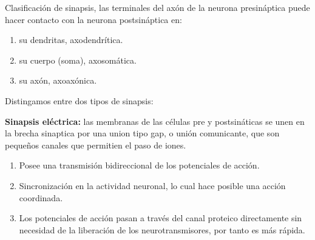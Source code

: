 Clasificación de sinapsis, las terminales del axón de la neurona presináptica puede hacer contacto con la neurona postsináptica en:
\begin{enumerate}
 \item su dendritas, axodendrítica.
 \item su cuerpo (soma), axosomática. 
 \item su axón, axoaxónica.
\end{enumerate}

Distingamos entre dos tipos de sinapsis:

 \textbf{Sinapsis eléctrica:} las membranas de las células pre y postsináticas se unen en la brecha sinaptica por una union tipo gap, o unión comunicante, que son pequeños canales que permitien el paso de iones.

	\begin{enumerate}
  	 \item Posee una transmisión bidireccional de los potenciales de acción.
  	 \item Sincronización en la actividad neuronal, lo cual hace posible una acción coordinada.
 	 \item Los potenciales de acción pasan a través del canal proteico directamente sin necesidad de la liberación de los neurotransmisores, por tanto es más rápida.
	\end{enumerate}

